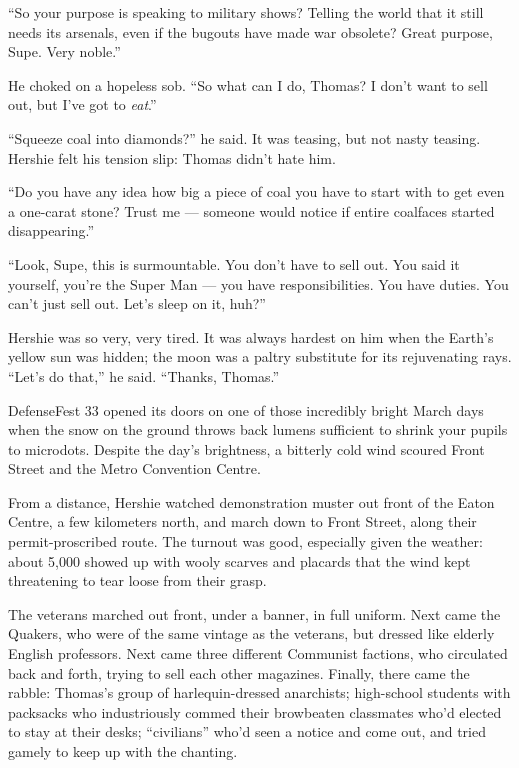 ``So your purpose is speaking to military shows? Telling the world that it 
still needs its arsenals, even if the bugouts have made war obsolete? Great 
purpose, Supe. Very noble.''

He choked on a hopeless sob.
``So what can I do, Thomas? I don't want to sell out, but I've got to 
\emph{eat}.''

``Squeeze coal into diamonds?'' he said. It was teasing, but not
nasty teasing. Hershie felt his tension slip: Thomas didn't hate
him.

``Do you have any idea how big a piece of coal you have to start with to get 
even a one-carat stone? Trust me --- someone would notice if entire coalfaces 
started disappearing.''

``Look, Supe, this is surmountable. You don't have to sell out. You said it 
yourself, you're the Super Man --- you have responsibilities. You have duties. 
You can't just sell out. Let's sleep on it, huh?''

Hershie was so very, very tired. It was always hardest on him when
the Earth's yellow sun was hidden; the moon was a paltry substitute
for its rejuvenating rays. ``Let's do that,'' he said.
``Thanks, Thomas.''

\tb

DefenseFest 33 opened its doors on one of those incredibly bright
March days when the snow on the ground throws back lumens
sufficient to shrink your pupils to microdots. Despite the day's
brightness, a bitterly cold wind scoured Front Street and the Metro
Convention Centre.

From a distance, Hershie watched demonstration muster out front of
the Eaton Centre, a few kilometers north, and march down to Front
Street, along their permit-proscribed route. The turnout was good,
especially given the weather: about 5,000 showed up with wooly
scarves and placards that the wind kept threatening to tear loose
from their grasp.

The veterans marched out front, under a banner, in full uniform.
Next came the Quakers, who were of the same vintage as the
veterans, but dressed like elderly English professors. Next came
three different Communist factions, who circulated back and forth,
trying to sell each other magazines. Finally, there came the
rabble: Thomas's group of harlequin-dressed anarchists; high-school
students with packsacks who industriously commed their browbeaten
classmates who'd elected to stay at their desks; ``civilians''
who'd seen a notice and come out, and tried gamely to keep up with
the chanting.

